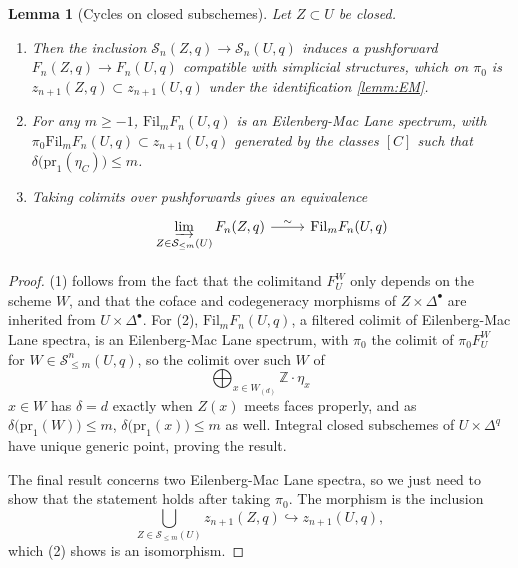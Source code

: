 \documentclass[11pt, twoside]{article}
\numberwithin{equation}{section}
\newtheorem{lemma}[equation]{Lemma}
\theoremstyle{definition}
\newcommand{\bb}[1]{\mathbb{#1}}
\newcommand{\colim}{\varinjlim}
\newcommand{\pr}{\mathrm{pr}}
\newcommand{\fil}{\mathrm{Fil}}
\begin{document}
\begin{lemma}[Cycles on closed subschemes]\label{lemm:Z-S-fil}
Let \(Z \subset U\) be closed.
\begin{enumerate}

\item Then the inclusion \(\mathcal{S}_n(Z, q) \to \mathcal{S}_n(U, q)\) induces a pushforward \(F_n(Z, q) \to F_n(U, q)\) compatible with simplicial structures, which on \(\pi_0\) is \(z_{n + 1}(Z, q) \subset z_{n + 1}(U, q)\) under the identification \ref{lemm:EM}.

\item For any \(m \geq - 1\), \(\fil_m F_n(U, q)\) is an Eilenberg-Mac Lane spectrum, with \(\pi_0 \fil_m F_n(U, q) \subset z_{n + 1}(U, q)\) generated by the classes \([C]\) such that \(\delta\big(\pr_1(\eta_C)\big) \leq m\).

\item Taking colimits over pushforwards gives an equivalence 
\[\begin{tikzcd}
\displaystyle \colim_{Z \in \mathcal{S}_{\leq m}(U)} F_n(Z, q) \ar[r, "\sim"] & \fil_m F_n(U, q)
\end{tikzcd}\]
\end{enumerate}
\end{lemma}

\begin{proof}
(1) follows from the fact that the colimitand \(F_U^W\) only depends on the scheme \(W\), and that the coface and codegeneracy morphisms of \(Z \times \Delta^\bullet\) are inherited from \(U \times \Delta^\bullet\). For (2), \(\fil_m F_n(U, q)\), a filtered colimit of Eilenberg-Mac Lane spectra, is an Eilenberg-Mac Lane spectrum, with \(\pi_0\) the colimit of \(\pi_0 F_U^W\) for \(W \in \mathcal{S}_{\leq m}^n(U, q)\), so the colimit over such \(W\) of 
\[\bigoplus_{x \in W_{(d)}} \bb{Z} \cdot \eta_x\]
\(x \in W\) has \(\delta = d\) exactly when \(Z(x)\) meets faces properly, and as \(\delta\big(\pr_1(W)\big) \leq m\), \(\delta\big(\pr_1(x)\big) \leq m\) as well. Integral closed subschemes of \(U \times \Delta^q\) have unique generic point, proving the result.

The final result concerns two Eilenberg-Mac Lane spectra, so we just need to show that the statement holds after taking \(\pi_0\). The morphism is the inclusion 
\[\bigcup_{Z \in \mathcal{S}_{\leq m}(U)} z_{n + 1}(Z, q) \hookrightarrow z_{n + 1}(U, q),\]
which (2) shows is an isomorphism.
\end{proof}
\end{document}
